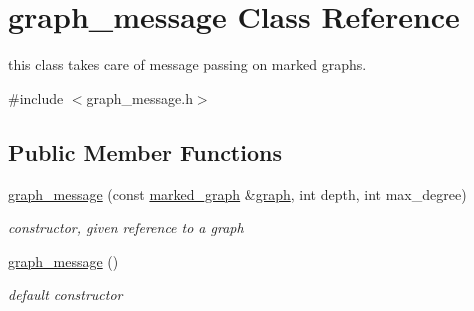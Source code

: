 \hypertarget{classgraph__message}{}\section{graph\+\_\+message Class Reference}
\label{classgraph__message}


this class takes care of message passing on marked graphs.  




{\ttfamily \#include $<$graph\+\_\+message.\+h$>$}

\subsection*{Public Member Functions}
\begin{DoxyCompactItemize}
\item 
\hyperlink{classgraph__message_a792e738b94a19f914e5495c416defe4d}{graph\+\_\+message} (const \hyperlink{classmarked__graph}{marked\+\_\+graph} \&\hyperlink{classgraph}{graph}, int depth, int max\+\_\+degree)
\begin{DoxyCompactList}\small\item\em constructor, given reference to a graph \end{DoxyCompactList}\item 
\hyperlink{classgraph__message_aa21140453eb0e1de98a2ddfcf2832aeb}{graph\+\_\+message} ()
\begin{DoxyCompactList}\small\item\em default constructor \end{DoxyCompactList}\end{DoxyCompactItemize}
